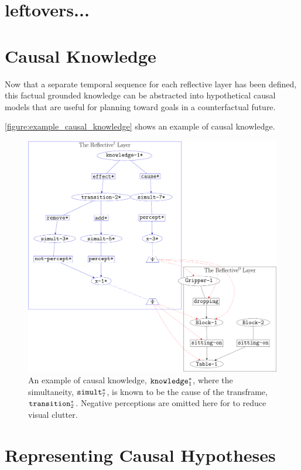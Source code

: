 \section{leftovers...}

\section{Causal Knowledge}

Now that a separate temporal sequence for each reflective layer has
been defined, this factual grounded knowledge can be abstracted into
hypothetical causal models that are useful for planning toward goals
in a counterfactual future.



{\mbox{\autoref{figure:example_causal_knowledge}}} shows an example of
causal knowledge.
\begin{figure}
\center
\includegraphics[width=12cm]{gfx/example_causal_knowledge}
\caption[An example of a causal knowledge.]{An example of causal
  knowledge, $\text{\tt{knowledge}}_1^*$, where the simultaneity,
  $\text{\tt{simult}}_7^*$, is known to be the cause of the
  transframe, $\text{\tt{transition}}_2^*$.  Negative perceptions are
  omitted here for to reduce visual clutter.}
\label{figure:example_causal_knowledge}
\end{figure}

\section{Representing Causal Hypotheses}


